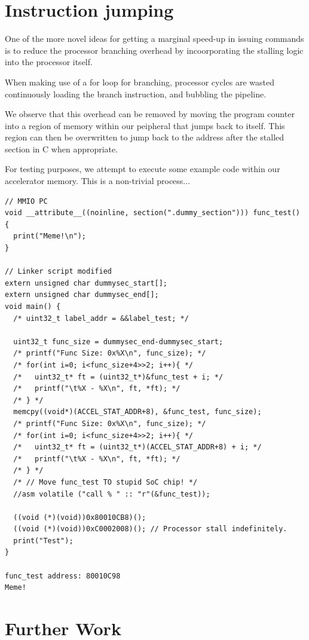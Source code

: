 \documentclass[a4paper,8pt]{report}
\begin{document}
\section{Instruction jumping}
One of the more novel ideas for getting a marginal speed-up in issuing commands
is to reduce the processor branching overhead by incoorporating the stalling
logic into the processor itself.

When making use of a for loop for branching, processor cycles are wasted
continuously loading the branch instruction, and bubbling the pipeline.

We observe that this overhead can be removed by moving the program counter into
a region of memory within our peipheral that jumps back to itself. This region
can then be overwritten to jump back to the address after the stalled section in
C when appropriate.

For testing purposes, we attempt to execute some example code within our
accelerator memory. This is a non-trivial process...
\begin{verbatim}
// MMIO PC
void __attribute__((noinline, section(".dummy_section"))) func_test() {
  print("Meme!\n");
}

// Linker script modified
extern unsigned char dummysec_start[];
extern unsigned char dummysec_end[];
void main() {
  /* uint32_t label_addr = &&label_test; */

  uint32_t func_size = dummysec_end-dummysec_start;
  /* printf("Func Size: 0x%X\n", func_size); */
  /* for(int i=0; i<func_size+4>>2; i++){ */
  /*   uint32_t* ft = (uint32_t*)&func_test + i; */
  /*   printf("\t%X - %X\n", ft, *ft); */
  /* } */
  memcpy((void*)(ACCEL_STAT_ADDR+8), &func_test, func_size);
  /* printf("Func Size: 0x%X\n", func_size); */
  /* for(int i=0; i<func_size+4>>2; i++){ */
  /*   uint32_t* ft = (uint32_t*)(ACCEL_STAT_ADDR+8) + i; */
  /*   printf("\t%X - %X\n", ft, *ft); */
  /* } */
  /* // Move func_test TO stupid SoC chip! */
  //asm volatile ("call % " :: "r"(&func_test));

  ((void (*)(void))0x80010CB8)();
  ((void (*)(void))0xC0002008)(); // Processor stall indefinitely.
  print("Test");
}

func_test address: 80010C98
Meme!
\end{verbatim}

\section{Further Work}
\end{document}
